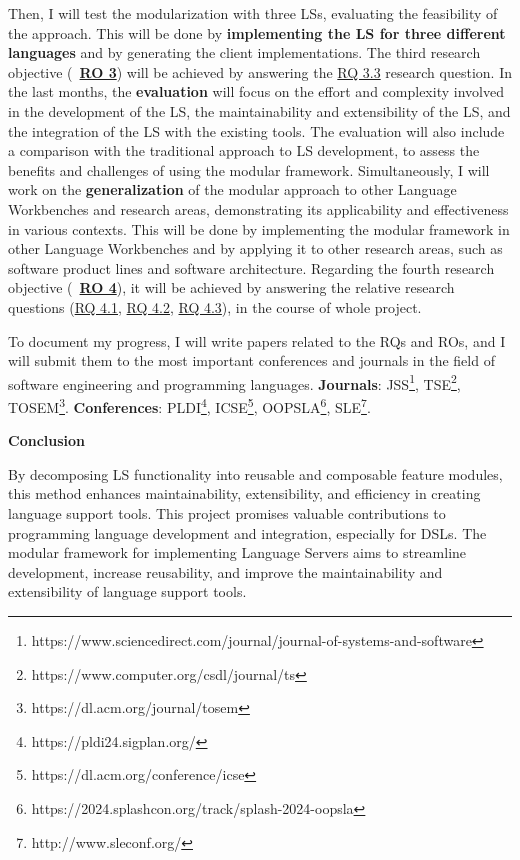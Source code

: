Then, I will test the modularization with three LSs, evaluating the feasibility of the approach. This will be done by \textbf{implementing the LS for three different languages} and by generating the client implementations. The third research objective (~\hyperlink{ro3}{\textbf{RO 3}}) will be achieved by answering the \hyperlink{rq33}{\textsf{RQ 3.3}} research question.
In the last months, the \textbf{evaluation} will focus on the effort and complexity involved in the development of the LS, the maintainability and extensibility of the LS, and the integration of the LS with the existing tools. The evaluation will also include a comparison with the traditional approach to LS development, to assess the benefits and challenges of using the modular framework.
Simultaneously, I will work on the \textbf{generalization} of the modular approach to other Language Workbenches and research areas, demonstrating its applicability and effectiveness in various contexts. This will be done by implementing the modular framework in other Language Workbenches and by applying it to other research areas, such as software product lines and software architecture.
Regarding the fourth research objective (~\hyperlink{ro4}{\textbf{RO 4}}), it will be achieved by answering the relative research questions (\hyperlink{rq41}{\textsf{RQ 4.1}}, \hyperlink{rq42}{\textsf{RQ 4.2}}, \hyperlink{rq43}{\textsf{RQ 4.3}}), in the course of whole project.

To document my progress, I will write papers related to the \textsf{RQ}s and \textsf{RO}s, and I will submit them to the most important conferences and journals in the field of software engineering and programming languages.
\textbf{Journals}: JSS\footnote{https://www.sciencedirect.com/journal/journal-of-systems-and-software}, TSE\footnote{https://www.computer.org/csdl/journal/ts}, TOSEM\footnote{https://dl.acm.org/journal/tosem}.
\textbf{Conferences}: PLDI\footnote{https://pldi24.sigplan.org/}, ICSE\footnote{https://dl.acm.org/conference/icse}, OOPSLA\footnote{https://2024.splashcon.org/track/splash-2024-oopsla}, SLE\footnote{http://www.sleconf.org/}.


\hfill \break
\noindent
\textbf{Conclusion}

By decomposing LS functionality into reusable and composable feature modules, this method enhances maintainability, extensibility, and efficiency in creating language support tools. This project promises valuable contributions to programming language development and integration, especially for DSLs. The modular framework for implementing Language Servers aims to streamline development, increase reusability, and improve the maintainability and extensibility of language support tools.
